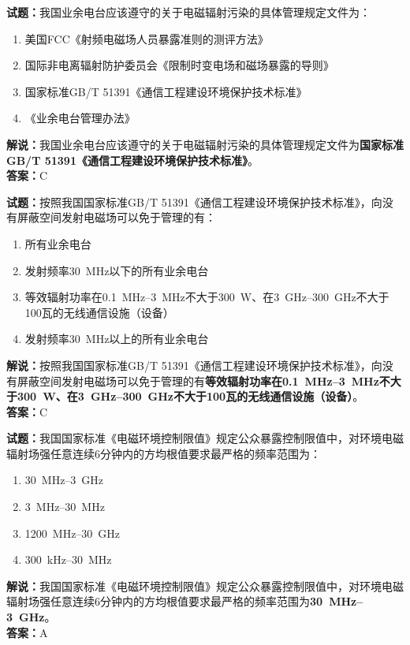 \documentclass{ctexbook}
\begin{document}
\vspace{\baselineskip}

\noindent\textbf{试题：}我国业余电台应该遵守的关于电磁辐射污染的具体管理规定文件为：
\begin{enumerate}[leftmargin=3em]
  \item 美国FCC《射频电磁场人员暴露准则的测评方法》
  \item 国际非电离辐射防护委员会《限制时变电场和磁场暴露的导则》
  \item 国家标准GB/T 51391《通信工程建设环境保护技术标准》
  \item 《业余电台管理办法》
\end{enumerate}
\noindent\textbf{解说：}我国业余电台应该遵守的关于电磁辐射污染的具体管理规定文件为\textbf{国家标准GB/T 51391《通信工程建设环境保护技术标准》}。\\\textbf{答案：}C

\vspace{\baselineskip}

\noindent\textbf{试题：}按照我国国家标准GB/T 51391《通信工程建设环境保护技术标准》，向没有屏蔽空间发射电磁场可以免于管理的有：
\begin{enumerate}[leftmargin=3em]
  \item 所有业余电台
  \item 发射频率\qty{30}{\MHz}以下的所有业余电台
  \item 等效辐射功率在\qtyrange{0.1}{3}{\MHz}不大于\qty{300}{\watt}、在\qtyrange{3}{300}{\GHz}不大于\num{100}瓦的无线通信设施（设备）
  \item 发射频率\qty{30}{\MHz}以上的所有业余电台
\end{enumerate}
\noindent\textbf{解说：}按照我国国家标准GB/T 51391《通信工程建设环境保护技术标准》，向没有屏蔽空间发射电磁场可以免于管理的有\textbf{等效辐射功率在\qtyrange{0.1}{3}{\MHz}不大于\qty{300}{\watt}、在\qtyrange{3}{300}{\GHz}不大于\num{100}瓦的无线通信设施（设备）}。\\\textbf{答案：}C

\vspace{\baselineskip}

\noindent\textbf{试题：}我国国家标准《电磁环境控制限值》规定公众暴露控制限值中，对环境电磁辐射场强任意连续6分钟内的方均根值要求最严格的频率范围为：
\begin{enumerate}[leftmargin=3em]
  \item \qty{30}{\MHz}--\qty{3}{\GHz}
  \item \qty{3}{\MHz}--\qty{30}{\MHz}
  \item \qty{1200}{\MHz}--\qty{30}{\GHz}
  \item \qty{300}{\kHz}--\qty{30}{\MHz}
\end{enumerate}
\noindent\textbf{解说：}我国国家标准《电磁环境控制限值》规定公众暴露控制限值中，对环境电磁辐射场强任意连续6分钟内的方均根值要求最严格的频率范围为\textbf{\qty{30}{\MHz}--\qty{3}{\GHz}}。\\
\textbf{答案：}A
\end{document}

